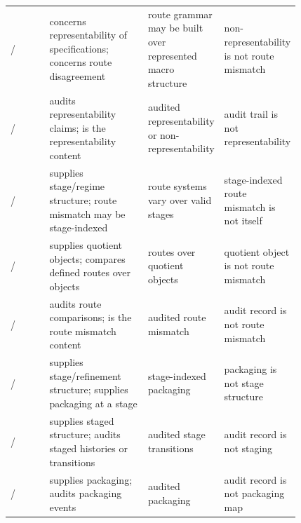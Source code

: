 \begin{landscape}
\begin{table}
\begin{tabular}{@{}lp{0.34\linewidth}p{0.24\linewidth}p{0.24\linewidth}@{}}
\Ptwo{}/\Pthree{} & \Ptwo{} concerns representability of specifications; \Pthree{} concerns route disagreement & route grammar may be built over represented macro structure & non-representability is not route mismatch \\
\Ptwo{}/\Psix{} & \Psix{} audits representability claims; \Ptwo{} is the representability content & audited representability or non-representability & audit trail is not representability \\
\Pthree{}/\Pfour{} & \Pfour{} supplies stage/regime structure; \Pthree{} route mismatch may be stage-indexed & route systems vary over valid stages & stage-indexed route mismatch is not \Pfour{} itself \\
\Pthree{}/\Pfive{} & \Pfive{} supplies quotient objects; \Pthree{} compares defined routes over objects & routes over quotient objects & quotient object is not route mismatch \\
\Pthree{}/\Psix{} & \Psix{} audits route comparisons; \Pthree{} is the route mismatch content & audited route mismatch & audit record is not route mismatch \\
\Pfour{}/\Pfive{} & \Pfour{} supplies stage/refinement structure; \Pfive{} supplies packaging at a stage & stage-indexed packaging & packaging is not stage structure \\
\Pfour{}/\Psix{} & \Pfour{} supplies staged structure; \Psix{} audits staged histories or transitions & audited stage transitions & audit record is not staging \\
\Pfive{}/\Psix{} & \Pfive{} supplies packaging; \Psix{} audits packaging events & audited packaging & audit record is not packaging map \\
\bottomrule
\end{tabular}
\end{table}
\end{landscape}
